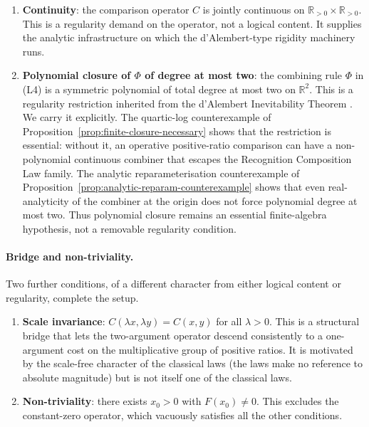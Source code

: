 \documentclass[11pt,a4paper]{article}
\theoremstyle{definition}
\theoremstyle{remark}
\begin{document}
\begin{enumerate}[label=(R\arabic*), leftmargin=*]
\item \textbf{Continuity}: the comparison operator $C$ is jointly
continuous on $\mathbb{R}_{>0} \times \mathbb{R}_{>0}$. This is a
regularity demand on the operator, not a logical content. It supplies
the analytic infrastructure on which the d'Alembert-type rigidity machinery
runs.
\item \textbf{Polynomial closure of $\Phi$ of degree at most two}: the
combining rule $\Phi$ in (L4) is a symmetric polynomial of total degree
at most two on $\mathbb{R}^2$. This is a regularity restriction inherited
from the d'Alembert Inevitability Theorem
\cite{WashburnZlatanovicAllahyarov2026}. We carry it explicitly. The
quartic-log counterexample of
Proposition~\ref{prop:finite-closure-necessary} shows that the
restriction is essential: without it, an operative positive-ratio
comparison can have a non-polynomial continuous combiner that escapes
the Recognition Composition Law family. The analytic reparameterisation
counterexample of Proposition~\ref{prop:analytic-reparam-counterexample}
shows that even real-analyticity of the combiner at the origin does not
force polynomial degree at most two. Thus polynomial closure remains an
essential finite-algebra hypothesis, not a removable regularity condition.
\end{enumerate}

\paragraph{Bridge and non-triviality.} Two further conditions, of a
different character from either logical content or regularity, complete
the setup.

\begin{enumerate}[label=(B\arabic*), leftmargin=*]
\item \textbf{Scale invariance}: $C(\lambda x, \lambda y) = C(x, y)$ for
all $\lambda > 0$. This is a structural bridge that lets the
two-argument operator descend consistently to a one-argument cost on the
multiplicative group of positive ratios. It is motivated by the
scale-free character of the classical laws (the laws make no reference
to absolute magnitude) but is not itself one of the classical laws.
\item \textbf{Non-triviality}: there exists $x_0 > 0$ with
$F(x_0) \neq 0$. This excludes the constant-zero operator, which
vacuously satisfies all the other conditions.
\end{enumerate}
\end{document}
